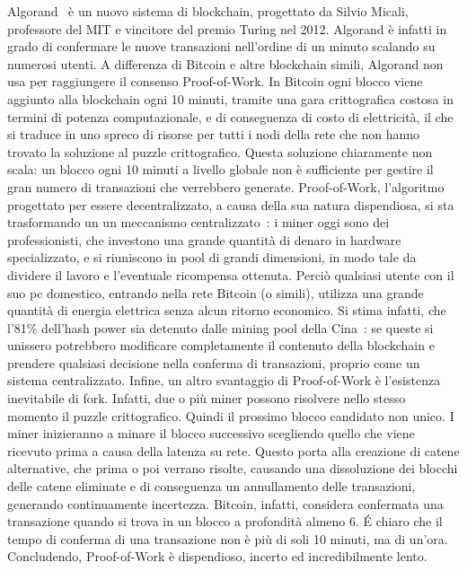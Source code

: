Algorand~\cite{gilad2017algorand, chen2019algorand} è un nuovo sistema di blockchain, progettato da Silvio Micali, professore del MIT e vincitore del premio Turing nel 2012. Algorand è infatti in grado di confermare le nuove transazioni nell'ordine di un minuto scalando su numerosi utenti. A differenza di Bitcoin e altre blockchain simili, Algorand non usa per raggiungere il consenso Proof-of-Work. In Bitcoin ogni blocco viene aggiunto alla blockchain ogni 10 minuti, tramite una gara crittografica costosa in termini di potenza computazionale, e di conseguenza di costo di elettricità, il che si traduce in uno spreco di risorse per tutti i nodi della rete che non hanno trovato la soluzione al puzzle crittografico. Questa soluzione chiaramente non scala: un blocco ogni 10 minuti a livello globale non è sufficiente per gestire il gran numero di transazioni che verrebbero generate.
Proof-of-Work, l'algoritmo progettato per essere decentralizzato, a causa della sua natura dispendiosa, si sta trasformando un un meccanismo centralizzato~\cite{bitcoin2019centralization}: i miner oggi sono dei professionisti, che investono una grande quantità di denaro in hardware specializzato, e si riuniscono in pool di grandi dimensioni, in modo tale da dividere il lavoro e l'eventuale ricompensa ottenuta. Perciò qualsiasi utente con il suo pc domestico, entrando nella rete Bitcoin (o simili), utilizza una grande quantità di energia elettrica senza alcun ritorno economico. Si stima infatti, che l'81\% dell'hash power sia detenuto dalle mining pool della Cina~\cite{bitcoinpool}: se queste si unissero potrebbero modificare completamente il contenuto della blockchain e prendere qualsiasi decisione nella conferma di transazioni, proprio come un sistema centralizzato.
Infine, un altro svantaggio di Proof-of-Work è l'esistenza inevitabile di fork. Infatti, due o più miner possono risolvere nello stesso momento il puzzle crittografico. Quindi il prossimo blocco candidato non unico. I miner inizieranno a minare il blocco successivo scegliendo quello che viene ricevuto prima a causa della latenza su rete. Questo porta alla creazione di catene alternative, che prima o poi verrano risolte, causando una dissoluzione dei blocchi delle catene eliminate e di conseguenza un annullamento delle transazioni, generando continuamente incertezza. Bitcoin, infatti, considera confermata una transazione quando si trova in un blocco a profondità almeno 6. \'E chiaro che il tempo di conferma di una transazione non è più di soli 10 minuti, ma di un'ora. Concludendo, Proof-of-Work è dispendioso, incerto ed incredibilmente lento.

